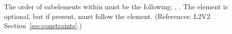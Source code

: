 The order of subelements within \Constraint must be the following:
, .  The  element is optional,
but if present, must follow the  element.  (References: L2V2
Section~\ref{sec:constraints}.)
